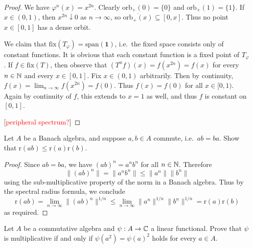 \begin{proof}
	We have $\varphi^n(x)=x^{2n}$. Clearly $\mathrm{orb}_+(0)=\{0\}$ and $\mathrm{orb}_+(1)=\{1\}$. If $x\in (0,1)$, then $x^{2n}\downarrow 0$ as $n\to\infty$, so $\overline{\mathrm{orb}_+(x)} \subseteq [0,x]$. Thus no point $x\in[0,1]$ has a dense orbit.
	
	We claim that $\mathrm{fix}(T_\varphi)=\mathrm{span}(\mathbf{1})$, i.e.\ the fixed space consists only of constant functions. It is obvious that each constant function is a fixed point of $T_\varphi$. If $f\in\mathrm{fix}(T)$, then observe that $(T^n f)(x)=f(x^{2n})=f(x)$ for every $n\in\mathbb{N}$ and every $x\in [0,1]$. Fix $x \in (0,1)$ arbitrarily. Then by continuity, $f(x)=\lim_{n\to\infty}f(x^{2n})=f(0)$. Thus $f(x)=f(0)$ for all $x\in [0,1)$. Again by continuity of $f$, this extends to $x=1$ as well, and thus $f$ is constant on $[0,1]$.
	
	[\textcolor{red}{peripheral spectrum?}]
\end{proof}

\begin{exercise}[Ex.\ 4.7]
	Let $A$ be a Banach algebra, and suppose $a,b\in A$ commute, i.e.\ $ab=ba$. Show that $\mathrm{r}(ab)\le \mathrm{r}(a)\mathrm{r}(b)$.
\end{exercise}

\begin{proof}
	Since $ab=ba$, we have $(ab)^n = a^n b^n$ for all $n\in\mathbb{N}$. Therefore
	\begin{equation*}
		\|(ab)^n\| = \|a^n b^n\| \le \|a^n\| \|b^n\|
	\end{equation*}
	using the sub-multiplicative property of the norm in a Banach algebra. Thus by the spectral radius formula, we conclude
	\begin{equation*}
		\mathrm{r}(ab) = \lim_{n\to\infty} \|(ab)^n\|^{1/n} \le \lim_{n\to\infty} \|a^n\|^{1/n} \|b^n\|^{1/n} = \mathrm{r}(a)\mathrm{r}(b)
	\end{equation*}
	as required.
\end{proof}

\begin{exercise}[Ex.\ 4.8]
	Let $A$ be a commutative algebra and $\psi:A \to\mathbb{C}$ a linear functional. Prove that $\psi$ is multiplicative if and only if $\psi(a^2)=\psi(a)^2$ holds for every $a\in A$.
\end{exercise}

